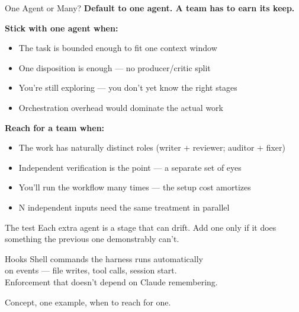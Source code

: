 \documentclass[aspectratio=169, 11pt]{beamer}
\begin{document}
\begin{frame}{One Agent or Many?}
  \textbf{Default to one agent. A team has to earn its keep.}

  \vspace{0.5em}
  \textbf{Stick with one agent when:}
  \begin{itemize}\small
    \item The task is bounded enough to fit one context window
    \item One disposition is enough --- no producer/critic split
    \item You're still exploring --- you don't yet know the right stages
    \item Orchestration overhead would dominate the actual work
  \end{itemize}

  \vspace{0.5em}
  \textbf{Reach for a team when:}
  \begin{itemize}\small
    \item The work has naturally distinct roles (writer + reviewer; auditor + fixer)
    \item Independent verification is the point --- a separate set of eyes
    \item You'll run the workflow many times --- the setup cost amortizes
    \item N independent inputs need the same treatment in parallel
  \end{itemize}

  \vspace{0.4em}
  \begin{block}{The test}
    Each extra agent is a stage that can drift. Add one only if it does something the previous one demonstrably can't.
  \end{block}
\end{frame}


\begin{frame}{Hooks}
  \centering
  \vspace{2em}
  {\Large Shell commands the harness runs automatically\\[0.3em]
  on events --- file writes, tool calls, session start.\\[0.3em]
  Enforcement that doesn't depend on Claude remembering.}

  \vspace{2em}
  Concept, one example, when to reach for one.
\end{frame}
\end{document}
